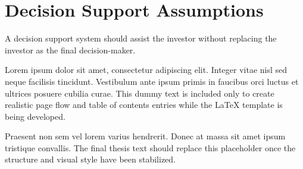 \section{Decision Support Assumptions}

A decision support system should assist the investor without replacing the investor as the final decision-maker.

Lorem ipsum dolor sit amet, consectetur adipiscing elit. Integer vitae nisl sed neque facilisis tincidunt. Vestibulum ante ipsum primis in faucibus orci luctus et ultrices posuere cubilia curae. This dummy text is included only to create realistic page flow and table of contents entries while the LaTeX template is being developed.

Praesent non sem vel lorem varius hendrerit. Donec at massa sit amet ipsum tristique convallis. The final thesis text should replace this placeholder once the structure and visual style have been stabilized.

